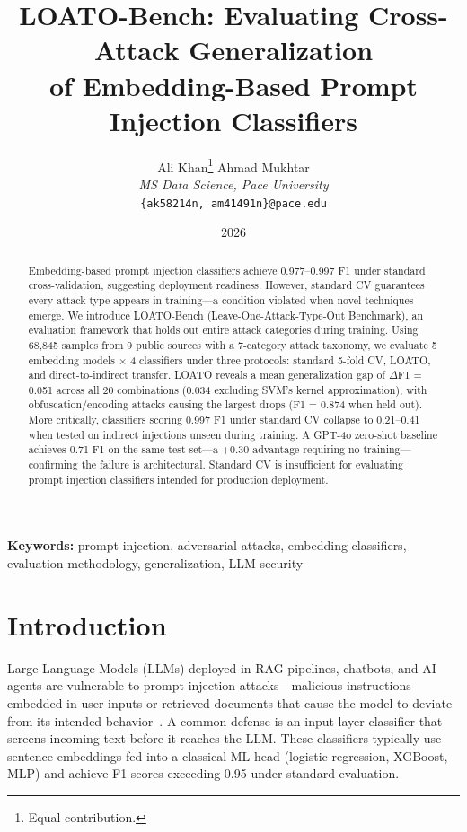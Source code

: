 \documentclass[11pt,a4paper]{article}
\title{LOATO-Bench: Evaluating Cross-Attack Generalization\\
       of Embedding-Based Prompt Injection Classifiers}
\author{Ali Khan\thanks{Equal contribution.} \quad Ahmad Mukhtar\footnotemark[1]\\[4pt]
  \textit{MS Data Science, Pace University}\\
  \texttt{\{ak58214n, am41491n\}@pace.edu}}
\date{2026}
\newcommand{\df}{$\Delta$F1}
\newcommand{\Fone}{F1}
\begin{document}
\maketitle

\begin{abstract}
Embedding-based prompt injection classifiers achieve 0.977--0.997 \Fone{} under
standard cross-validation, suggesting deployment readiness. However, standard CV
guarantees every attack type appears in training---a condition violated when
novel techniques emerge. We introduce LOATO-Bench (Leave-One-Attack-Type-Out
Benchmark), an evaluation framework that holds out entire attack categories
during training. Using 68,845 samples from 9 public sources with a 7-category
attack taxonomy, we evaluate 5 embedding models $\times$ 4 classifiers under
three protocols: standard 5-fold CV, LOATO, and direct-to-indirect transfer.
LOATO reveals a mean generalization gap of \df{} = 0.051 across all 20
combinations (0.034 excluding SVM's kernel approximation), with
obfuscation/encoding attacks causing the largest drops (\Fone{} = 0.874 when
held out). More critically, classifiers scoring 0.997 \Fone{} under standard CV
collapse to 0.21--0.41 when tested on indirect injections unseen during
training. A GPT-4o zero-shot baseline achieves 0.71 \Fone{} on the same test
set---a +0.30 advantage requiring no training---confirming the failure is
architectural. Standard CV is insufficient for evaluating prompt injection
classifiers intended for production deployment.
\end{abstract}

\medskip
\noindent\textbf{Keywords:} prompt injection, adversarial attacks, embedding
classifiers, evaluation methodology, generalization, LLM security

\section{Introduction}
\label{sec:intro}

Large Language Models (LLMs) deployed in RAG pipelines, chatbots, and AI agents
are vulnerable to prompt injection attacks---malicious instructions embedded in
user inputs or retrieved documents that cause the model to deviate from its
intended behavior~\citep{perez2022ignore,greshake2023not}. A common defense is
an input-layer classifier that screens incoming text before it reaches the LLM.
These classifiers typically use sentence embeddings fed into a classical ML head
(logistic regression, XGBoost, MLP) and achieve \Fone{} scores exceeding 0.95
under standard evaluation.
\end{document}
